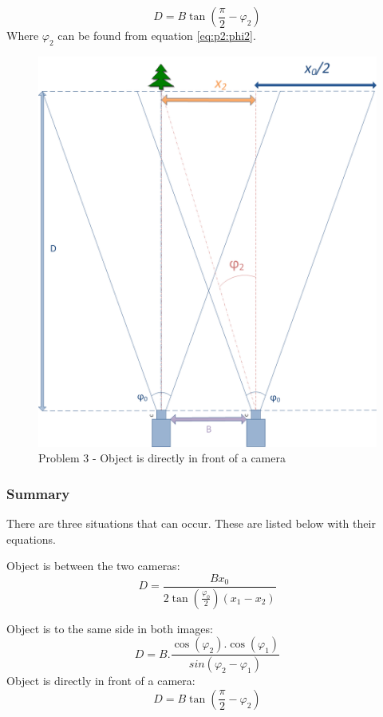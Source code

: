 \begin{equation} \label{eq:p3:D}
D = B \tan\left(\frac{\pi}{2} - \varphi_{2}\right)
\end{equation}
Where $\varphi_2$ can be found from equation \ref{eq:p2:phi2}. 
\begin{figure}
\includegraphics[width=\textwidth,height=\textheight,keepaspectratio]{Figures/problem3.png}
\caption{Problem 3 - Object is directly in front of a camera}
\label{fig:problem_infront}
\end{figure}

\subsubsection{Summary}
There are three situations that can occur. These are listed below with their equations.

Object is between the two cameras:
\begin{equation} \label{eq:summary:1}
D = \frac{Bx_0}{2\tan(\frac{\varphi_0}{2})(x_1 - x_2)}
\end{equation}

Object is to the same side in both images:
\begin{equation} \label{eq:summary:2}
D = B.\frac{\cos(\varphi_2).\cos(\varphi_1)}{sin(\varphi_2 - \varphi_1)}
\end{equation}
Object is directly in front of a camera:
\begin{equation} \label{eq:summary:3}
D = B \tan\left(\frac{\pi}{2} - \varphi_{2}\right)
\end{equation}

